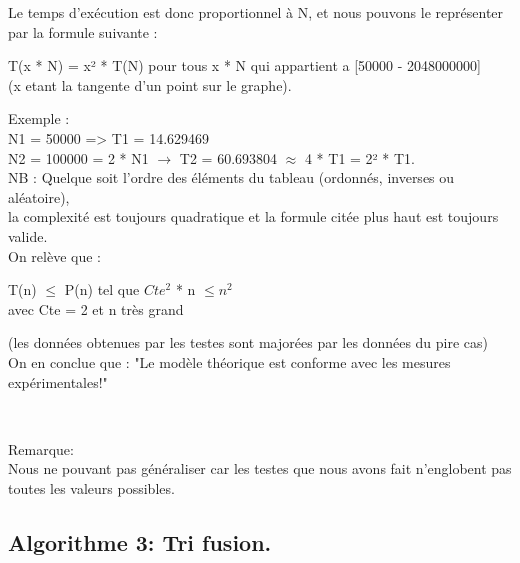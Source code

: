 \documentclass[12pt]{article}
\begin{document}
  Le temps d'exécution est donc proportionnel à N, et nous pouvons le représenter par la formule suivante : \\
 
\begin{center}

\color{red}
T(x * N) = x² * T(N) pour tous x * N qui appartient a [50000 - 2048000000]\\
\color{black}
(x etant la tangente d'un point sur le graphe).\\

\end{center}

  Exemple : \\
  N1 = 50000 => T1 = 14.629469\\
  N2 = 100000 = 2 * N1 $\rightarrow$ T2 = 60.693804 $\approx$ 4 * T1 = 2² * T1.\\

  NB : Quelque soit l'ordre des éléments du tableau \color{blue} (ordonnés, inverses ou aléatoire)\color{black},\\
  la complexité est toujours quadratique et la formule citée plus haut est toujours valide.\\

On relève que :
\begin{center}
\color{blue} 
 T(n) $\le$ P(n) tel que $ Cte^2$ * n $\le n^2$ \\
\color{black}
 avec Cte = 2 et n très grand\\
\end{center}

 (les données obtenues par les testes sont majorées par les données du pire cas)\\
  
  On en conclue que :
\color{red}
 "Le modèle théorique est conforme avec les mesures expérimentales!"\\
\color{black}

\texttt{  }

\color{red}
Remarque:\\
\color{black}
Nous ne pouvant pas généraliser car les testes que nous avons fait n'englobent pas toutes les valeurs possibles.




\newpage







\subsection{Algorithme 3: Tri fusion.}
\end{document}
